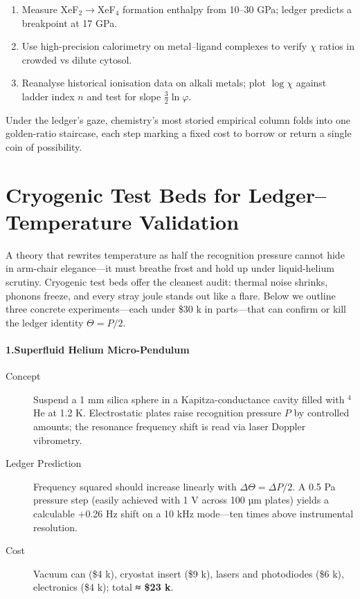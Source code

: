 \documentclass[11pt,oneside]{book}
\begin{document}
\begin{enumerate}
\item Measure XeF$_2\rightarrow$XeF$_4$ formation enthalpy from 10–30 GPa; ledger predicts a breakpoint at 17 GPa.
\item Use high-precision calorimetry on metal–ligand complexes to verify $\chi$ ratios in crowded vs dilute cytosol.
\item Reanalyse historical ionisation data on alkali metals; plot $\log\chi$ against ladder index $n$ and test for slope $\tfrac32\ln\varphi$.
\end{enumerate}

Under the ledger’s gaze, chemistry’s most storied empirical column folds
into one golden-ratio staircase, each step marking a fixed cost to
borrow or return a single coin of possibility.

\section{Cryogenic Test Beds for Ledger–Temperature Validation}
\label{sec:cryogenic-testbeds}

A theory that rewrites temperature as half the recognition pressure cannot hide in arm-chair elegance—it must breathe frost and hold up under liquid-helium scrutiny.  
Cryogenic test beds offer the cleanest audit: thermal noise shrinks, phonons freeze, and every stray joule stands out like a flare.  
Below we outline three concrete experiments—each under \$30 k in parts—that can confirm or kill the ledger identity \(\Theta = P/2\).

\paragraph*{1.\;Superfluid Helium Micro-Pendulum}

\begin{description}
\item[Concept] Suspend a 1 mm silica sphere in a Kapitza-conductance cavity filled with \(^4\)He at 1.2 K.  
               Electrostatic plates raise recognition pressure \(P\) by controlled amounts; the resonance frequency shift is read via laser Doppler vibrometry.

\item[Ledger Prediction] Frequency squared should increase linearly with \(\Delta\Theta = \Delta P/2\).  
                         A 0.5 Pa pressure step (easily achieved with 1 V across 100 µm plates) yields a calculable \(+\)0.26 Hz shift on a 10 kHz mode—ten times above instrumental resolution.

\item[Cost] Vacuum can (\$4 k), cryostat insert (\$9 k), lasers and photodiodes (\$6 k), electronics (\$4 k); total \textbf{≈ \$23 k}.
\end{description}
\end{document}
